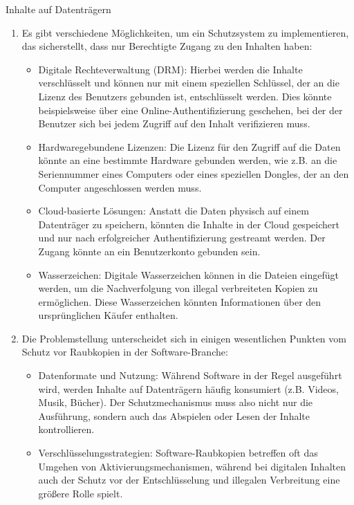 \documentclass{article}
\begin{document}
\begin{exercise}[1]{Inhalte auf Datenträgern}
  \begin{solution}
    \begin{enumerate}
      \item Es gibt verschiedene Möglichkeiten, um ein Schutzsystem zu implementieren, das sicherstellt, dass nur Berechtigte Zugang zu den Inhalten haben:
            \begin{itemize}
              \item Digitale Rechteverwaltung (DRM): Hierbei werden die Inhalte verschlüsselt und können nur mit einem speziellen Schlüssel, der an die Lizenz des Benutzers gebunden ist, entschlüsselt werden. Dies könnte beispielsweise über eine Online-Authentifizierung geschehen, bei der der Benutzer sich bei jedem Zugriff auf den Inhalt verifizieren muss.
              \item Hardwaregebundene Lizenzen: Die Lizenz für den Zugriff auf die Daten könnte an eine bestimmte Hardware gebunden werden, wie z.B. an die Seriennummer eines Computers oder eines speziellen Dongles, der an den Computer angeschlossen werden muss.
              \item Cloud-basierte Lösungen: Anstatt die Daten physisch auf einem Datenträger zu speichern, könnten die Inhalte in der Cloud gespeichert und nur nach erfolgreicher Authentifizierung gestreamt werden. Der Zugang könnte an ein Benutzerkonto gebunden sein.
              \item Wasserzeichen: Digitale Wasserzeichen können in die Dateien eingefügt werden, um die Nachverfolgung von illegal verbreiteten Kopien zu ermöglichen. Diese Wasserzeichen könnten Informationen über den ursprünglichen Käufer enthalten.
            \end{itemize}
      \item Die Problemstellung unterscheidet sich in einigen wesentlichen Punkten vom Schutz vor Raubkopien in der Software-Branche:
            \begin{itemize}
              \item Datenformate und Nutzung: Während Software in der Regel ausgeführt wird, werden Inhalte auf Datenträgern häufig konsumiert (z.B. Videos, Musik, Bücher). Der Schutzmechanismus muss also nicht nur die Ausführung, sondern auch das Abspielen oder Lesen der Inhalte kontrollieren.
              \item Verschlüsselungsstrategien: Software-Raubkopien betreffen oft das Umgehen von Aktivierungsmechanismen, während bei digitalen Inhalten auch der Schutz vor der Entschlüsselung und illegalen Verbreitung eine größere Rolle spielt.

\end{itemize}
\end{enumerate}
\end{solution}
\end{exercise}
\end{document}
